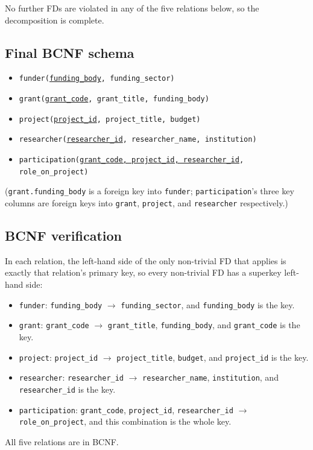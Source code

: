 \documentclass[11pt, letterpaper]{article}
\newcommand{\attr}[1]{\texttt{#1}}
\newcommand{\fd}{\ensuremath{\rightarrow}}
\newcommand{\pk}[1]{\underline{\texttt{#1}}}          %
\begin{document}
No further FDs are violated in any of the five relations below, so the decomposition is complete.

\subsection*{Final BCNF schema}
\begin{itemize}
  \item \attr{funder(}\pk{funding\_body}\attr{, funding\_sector)}
  \item \attr{grant(}\pk{grant\_code}\attr{, grant\_title, funding\_body)}
  \item \attr{project(}\pk{project\_id}\attr{, project\_title, budget)}
  \item \attr{researcher(}\pk{researcher\_id}\attr{, researcher\_name, institution)}
  \item \attr{participation(}\pk{grant\_code, project\_id, researcher\_id}\attr{, role\_on\_project)}
\end{itemize}
(\attr{grant.funding\_body} is a foreign key into \attr{funder}; \attr{participation}'s three key columns are foreign keys into \attr{grant}, \attr{project}, and \attr{researcher} respectively.)

\subsection*{BCNF verification}
In each relation, the left-hand side of the only non-trivial FD that applies is exactly that relation's primary key, so every non-trivial FD has a superkey left-hand side:
\begin{itemize}
  \item \attr{funder}: \attr{funding\_body} \fd{} \attr{funding\_sector}, and \attr{funding\_body} is the key.
  \item \attr{grant}: \attr{grant\_code} \fd{} \attr{grant\_title}, \attr{funding\_body}, and \attr{grant\_code} is the key.
  \item \attr{project}: \attr{project\_id} \fd{} \attr{project\_title}, \attr{budget}, and \attr{project\_id} is the key.
  \item \attr{researcher}: \attr{researcher\_id} \fd{} \attr{researcher\_name}, \attr{institution}, and \attr{researcher\_id} is the key.
  \item \attr{participation}: \attr{grant\_code}, \attr{project\_id}, \attr{researcher\_id} \fd{} \attr{role\_on\_project}, and this combination is the whole key.
\end{itemize}
All five relations are in BCNF.
\end{document}
